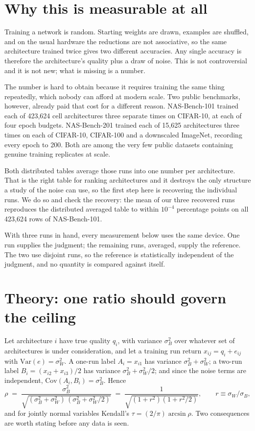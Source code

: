 \documentclass[11pt]{article}
\begin{document}
\section{Why this is measurable at all}\label{sec:why}

Training a network is random. Starting weights are drawn, examples are shuffled, and on the usual
hardware the reductions are not associative, so the same architecture trained twice gives two different
accuracies. Any single accuracy is therefore the architecture's quality plus a draw of noise. This is not
controversial and it is not new; what is missing is a number.

The number is hard to obtain because it requires training the same thing repeatedly, which nobody can
afford at modern scale. Two public benchmarks, however, already paid that cost for a different reason.
NAS-Bench-101 trained each of 423,624 cell architectures three separate times on CIFAR-10, at each of
four epoch budgets. NAS-Bench-201 trained each of 15,625 architectures three times on each of CIFAR-10,
CIFAR-100 and a downscaled ImageNet, recording every epoch to 200. Both are among the very few public
datasets containing genuine training replicates at scale.

Both distributed tables average those runs into one number per architecture. That is the right table for
ranking architectures and it destroys the only structure a study of the noise can use, so the first step
here is recovering the individual runs. We do so and check the recovery: the mean of our three recovered
runs reproduces the distributed averaged table to within $10^{-4}$ percentage points on all 423,624 rows
of NAS-Bench-101.

With three runs in hand, every measurement below uses the same device. One run supplies the judgment; the
remaining runs, averaged, supply the reference. The two use disjoint runs, so the reference is
statistically independent of the judgment, and no quantity is compared against itself.

\section{Theory: one ratio should govern the ceiling}\label{sec:theory}

Let architecture $i$ have true quality $q_i$, with variance $\sigma_B^2$ over whatever set of
architectures is under consideration, and let a training run return $x_{ij} = q_i + e_{ij}$ with
$\mathrm{Var}(e) = \sigma_W^2$. A one-run label $A_i = x_{i1}$ has variance $\sigma_B^2 + \sigma_W^2$; a
two-run label $B_i = (x_{i2}+x_{i3})/2$ has variance $\sigma_B^2 + \sigma_W^2/2$; and since the noise
terms are independent, $\mathrm{Cov}(A_i,B_i) = \sigma_B^2$. Hence
\begin{equation}
  \rho \;=\; \frac{\sigma_B^2}{\sqrt{(\sigma_B^2+\sigma_W^2)\,(\sigma_B^2+\sigma_W^2/2)}}
        \;=\; \frac{1}{\sqrt{(1+r^2)(1+r^2/2)}}, \qquad r \equiv \sigma_W/\sigma_B ,
  \label{eq:rho}
\end{equation}
and for jointly normal variables Kendall's $\tau = (2/\pi)\arcsin\rho$. Two consequences are worth stating
before any data is seen.
\end{document}
